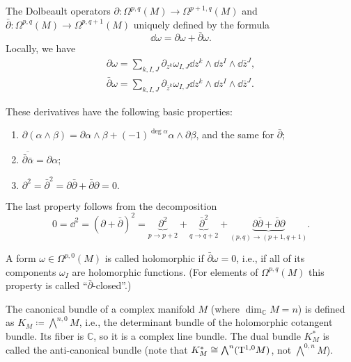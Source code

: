 \begin{defn}
    The Dolbeault operators $\partial:\Omega^{p,q}(M)\to\Omega^{p+1,q}(M)$ and $\bar\partial:\Omega^{p,q}(M)\to\Omega^{p,q+1}(M)$ uniquely defined by the formula
    \[\dd\omega=\partial\omega+\bar\partial\omega.\]
    Locally, we have 
    \begin{align}
        \partial\omega=\sum_{k,I,J}\partial_{z^k}\omega_{I,J}\dd z^k\wedge\dd z^I\wedge \dd\bar z^J,\\
        \bar\partial\omega=\sum_{k,I,J}\partial_{\bar z^k}\omega_{I,J}\dd z^k\wedge\dd z^I\wedge \dd\bar z^J.
    \end{align}
\end{defn}

These derivatives have the following basic properties:
\begin{enumerate}
    \item $\partial(\alpha\wedge\beta)=\partial\alpha\wedge\beta+(-1)^{\deg\alpha}\alpha\wedge\partial\beta$, and the same for $\bar\partial$;
    \item $\overline{\bar\partial\bar\alpha}=\partial\alpha$;
    \item $\partial^2=\bar\partial^2=\partial\bar\partial+\bar\partial\partial=0.$
\end{enumerate}
The last property follows from the decomposition \[0=\dd^2=(\partial+\bar\partial)^2=\underbrace{\partial^2}_{p\to p+2}+\underbrace{\bar\partial^2}_{q\to q+2}+\underbrace{\partial\bar\partial+\bar\partial\partial}_{(p,q)\to(p+1,q+1)}.\]


\begin{defn}
    A form $\omega\in\Omega^{p,0}(M)$ is called holomorphic if $\bar\partial\omega=0$, i.e., if all of its components $\omega_I$ are holomorphic functions. (For elements of $\Omega^{p,q}(M)$ this property is called ``$\bar\partial$-closed''.)
\end{defn}

\begin{defn}
    The canonical bundle of a complex manifold $M$ (where $\dim_\mathbb{C} M=n$) is defined as $K_M\coloneqq \bigwedge^{n,0}M$, i.e., the determinant bundle of the holomorphic cotangent bundle. Its fiber is $\mathbb{C}$, so it is a complex line bundle. The dual bundle $K^\ast_M$ is called the anti-canonical bundle (note that $K^\ast_M\cong \bigwedge^n(\mathrm{T}^{1,0}M)$, not $\bigwedge^{0,n}M$).
\end{defn}



